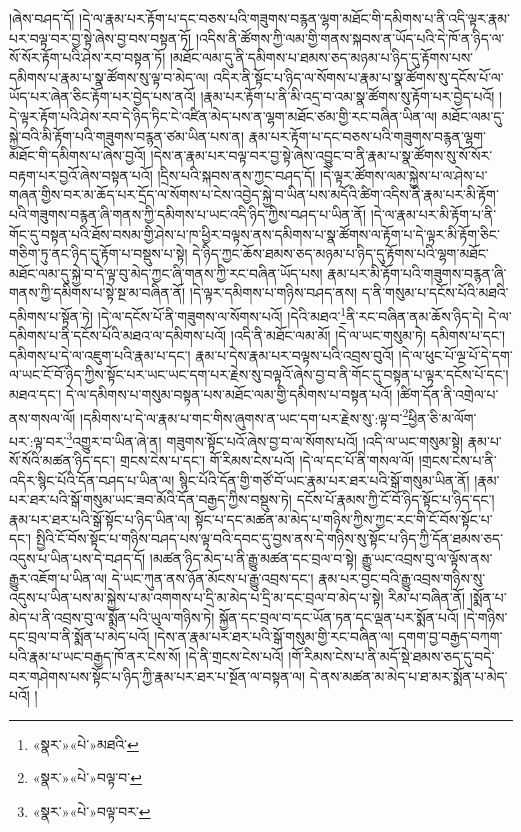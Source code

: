 །ཞེས་བཤད་དོ། །དེ་ལ་རྣམ་པར་རྟོག་པ་དང་བཅས་པའི་གཟུགས་བརྙན་ལྷག་མཐོང་གི་དམིགས་པ་ནི་འདི་ལྟར་རྣམ་པར་བལྟ་བར་བྱ་སྟེ་ཞེས་བྱ་བས་བསྟན་ཏོ། །འདིས་ནི་ཚོགས་ཀྱི་ལམ་གྱི་གནས་སྐབས་ན་ཡོད་པའི་དེ་ཁོ་ན་ཉིད་ལ་སོ་སོར་རྟོག་པའི་ཤེས་རབ་བསྟན་ཏོ། །མཐོང་ལམ་དུ་ནི་དམིགས་པ་ཐམས་ཅད་མཉམ་པ་ཉིད་དུ་རྟོགས་པས་དམིགས་པ་རྣམ་པ་སྣ་ཚོགས་སུ་ལྟ་བ་མེད་ལ། འདིར་ནི་སྟོང་པ་ཉིད་ལ་སོགས་པ་རྣམ་པ་སྣ་ཚོགས་སུ་དངོས་པོ་ལ་ཡོད་པར་ཞེན་ཅིང་རྟོག་པར་བྱེད་པས་ནའོ། །རྣམ་པར་རྟོག་པ་ནི་མི་འདྲ་བ་འམ་སྣ་ཚོགས་སུ་རྟོག་པར་བྱེད་པའོ། །དེ་ལྟར་རྟོག་པའི་ཤེས་རབ་དེ་ཉིད་ཏིང་ངེ་འཛིན་མེད་པས་ན་ལྷག་མཐོང་ཙམ་གྱི་རང་བཞིན་ཡིན་ལ། མཐོང་ལམ་དུ་སྐྱེ་བའི་མི་རྟོག་པའི་གཟུགས་བརྙན་ཙམ་ཡིན་པས་ན། རྣམ་པར་རྟོག་པ་དང་བཅས་པའི་གཟུགས་བརྙན་ལྷག་མཐོང་གི་དམིགས་པ་ཞེས་བྱའོ། །དེས་ན་རྣམ་པར་བལྟ་བར་བྱ་སྟེ་ཞེས་འབྱུང་བ་ནི་རྣམ་པ་སྣ་ཚོགས་སུ་སོ་སོར་བརྟག་པར་བྱའོ་ཞེས་བསྟན་པའོ། །དྲིས་པའི་སྐབས་ནས་ཀྱང་བཤད་དོ། །དེ་ལྟར་ཚོགས་ལམ་སྐྱེས་པ་ལ་ཤེས་པ་གཞན་གྱིས་བར་མ་ཆོད་པར་དྲོད་ལ་སོགས་པ་ངེས་འབྱེད་སྐྱེ་བ་ཡིན་པས་མདོའི་ཚིག་འདིས་ནི་རྣམ་པར་མི་རྟོག་པའི་གཟུགས་བརྙན་ཞི་གནས་ཀྱི་དམིགས་པ་ཡང་འདི་ཉིད་ཀྱིས་བཤད་པ་ཡིན་ནོ། །དེ་ལ་རྣམ་པར་མི་རྟོག་པ་ནི་གོང་དུ་བསྟན་པའི་ཐོས་བསམ་གྱི་ཤེས་པ་ཁ་ཕྱིར་བལྟས་ནས་དམིགས་པ་སྣ་ཚོགས་ལ་རྟོག་པ་དེ་ལྟར་མི་རྟོག་ཅིང་གཅིག་ཏུ་ནང་ཉིད་དུ་རྟོག་པ་བསྡུས་པ་སྟེ། དེ་ཉིད་ཀྱང་ཆོས་ཐམས་ཅད་མཉམ་པ་ཉིད་དུ་རྟོགས་པའི་ལྷག་མཐོང་མཐོང་ལམ་དུ་སྐྱེ་བ་དེ་ལྟ་བུ་མེད་ཀྱང་ཞི་གནས་ཀྱི་རང་བཞིན་ཡོད་པས། རྣམ་པར་མི་རྟོག་པའི་གཟུགས་བརྙན་ཞི་གནས་ཀྱི་དམིགས་པ་སྟེ་སྔ་མ་བཞིན་ནོ། །དེ་ལྟར་དམིགས་པ་གཉིས་བཤད་ནས། ད་ནི་གསུམ་པ་དངོས་པོའི་མཐའི་དམིགས་པ་སྟོན་ཏེ། །དེ་ལ་དངོས་པོ་ནི་གཟུགས་ལ་སོགས་པའོ། །དེའི་མཐའ་\footnote{«སྣར་»«པེ་»མཐའི་}ནི་རང་བཞིན་ནམ་ཆོས་ཉིད་དེ། དེ་ལ་དམིགས་པ་ནི་དངོས་པོའི་མཐའ་ལ་དམིགས་པའོ། །འདི་ནི་མཐོང་ལམ་མོ། །དེ་ལ་ཡང་གསུམ་ཏེ། དམིགས་པ་དང་། དམིགས་པ་དེ་ལ་འཇུག་པའི་རྣམ་པ་དང་། རྣམ་པ་དེས་རྣམ་པར་བལྟས་པའི་འབྲས་བུའོ། །དེ་ལ་ཕུང་པོ་ལྔ་པོ་དེ་དག་ལ་ཡང་ངོ་བོ་ཉིད་ཀྱིས་སྟོང་པར་ཡང་ཡང་དག་པར་རྗེས་སུ་བལྟའོ་ཞེས་བྱ་བ་ནི་གོང་དུ་བསྟན་པ་ལྟར་དངོས་པོ་དང་། མཐའ་དང་། དེ་ལ་དམིགས་པ་གསུམ་བསྟན་པས་མཐོང་ལམ་གྱི་དམིགས་པ་བསྟན་པའོ། །ཚིག་དོན་ནི་འགྲེལ་པ་ནས་གསལ་ལོ། །དམིགས་པ་དེ་ལ་རྣམ་པ་གང་གིས་ཞུགས་ན་ཡང་དག་པར་རྗེས་སུ་:ལྟ་བ་\footnote{«སྣར་»«པེ་»བལྟ་བ་}ཕྱིན་ཅི་མ་ལོག་པར་:ལྟ་བར་\footnote{«སྣར་»«པེ་»བལྟ་བར་}འགྱུར་བ་ཡིན་ཞེ་ན། གཟུགས་སྟོང་པའོ་ཞེས་བྱ་བ་ལ་སོགས་པའོ། །འདི་ལ་ཡང་གསུམ་སྟེ། རྣམ་པ་སོ་སོའི་མཚན་ཉིད་དང་། གྲངས་ངེས་པ་དང་། གོ་རིམས་ངེས་པའོ། །དེ་ལ་དང་པོ་ནི་གསལ་ལོ། །གྲངས་ངེས་པ་ནི་འདིར་སྙིང་པོའི་དོན་བཤད་པ་ཡིན་ལ། སྙིང་པོའི་དོན་གྱི་གཙོ་བོ་ཡང་རྣམ་པར་ཐར་པའི་སྒོ་གསུམ་ཡིན་ནོ། །རྣམ་པར་ཐར་པའི་སྒོ་གསུམ་ཡང་ཟབ་མོའི་དོན་བརྒྱད་ཀྱིས་བསྡུས་ཏེ། དངོས་པོ་རྣམས་ཀྱི་ངོ་བོ་ཉིད་སྟོང་པ་ཉིད་དང་། རྣམ་པར་ཐར་པའི་སྒོ་སྟོང་པ་ཉིད་ཡིན་ལ། སྟོང་པ་དང་མཚན་མ་མེད་པ་གཉིས་ཀྱིས་ཀྱང་རང་གི་ངོ་བོས་སྟོང་པ་དང་། སྤྱིའི་ངོ་བོས་སྟོང་པ་གཉིས་བཤད་པས་ལྟ་བའི་དབང་དུ་བྱས་ནས་དེ་གཉིས་སུ་སྟོང་པ་ཉིད་ཀྱི་དོན་ཐམས་ཅད་འདུས་པ་ཡིན་པས་དེ་བཤད་དོ། །མཚན་ཉིད་མེད་པ་ནི་རྒྱུ་མཚན་དང་བྲལ་བ་སྟེ། རྒྱུ་ཡང་འབྲས་བུ་ལ་ལྟོས་ནས་རྒྱུར་འཇོག་པ་ཡིན་ལ། དེ་ཡང་ཀུན་ནས་ཉོན་མོངས་པ་རྒྱུ་འབྲས་དང་། རྣམ་པར་བྱང་བའི་རྒྱུ་འབྲས་གཉིས་སུ་འདུས་པ་ཡིན་པས་མ་སྐྱེས་པ་མ་འགགས་པ་དྲི་མ་མེད་པ་དྲི་མ་དང་བྲལ་བ་མེད་པ་སྟེ། རིམ་པ་བཞིན་ནོ། །སྨོན་པ་མེད་པ་ནི་འབྲས་བུ་ལ་སྨོན་པའི་ཡུལ་གཉིས་ཏེ། སྐྱོན་དང་བྲལ་བ་དང་ཡོན་ཏན་དང་ལྡན་པར་སྨོན་པའོ། །དེ་གཉིས་དང་བྲལ་བ་ནི་སྨོན་པ་མེད་པའོ། །དེས་ན་རྣམ་པར་ཐར་པའི་སྒོ་གསུམ་གྱི་རང་བཞིན་ལ། དགག་བྱ་བརྒྱད་བཀག་པའི་རྣམ་པ་ཡང་བརྒྱད་ཁོ་ནར་ངེས་སོ། །དེ་ནི་གྲངས་ངེས་པའོ། །གོ་རིམས་ངེས་པ་ནི་མདོ་སྡེ་ཐམས་ཅད་དུ་བདེ་བར་གཤེགས་པས་སྟོང་པ་ཉིད་ཀྱི་རྣམ་པར་ཐར་པ་སྔོན་ལ་བསྟན་ལ། དེ་ནས་མཚན་མ་མེད་པ་ཐ་མར་སྨོན་པ་མེད་པའོ། །
